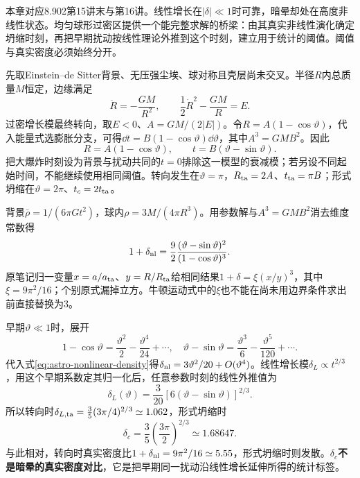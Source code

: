 本章对应8.902第15讲末与第16讲。线性增长在$|\delta|\ll1$时可靠，暗晕却处在高度非线性状态。均匀球形过密区提供一个能完整求解的桥梁：由其真实非线性演化确定坍缩时刻，再把早期扰动按线性理论外推到这个时刻，建立用于统计的阈值。阈值与真实密度必须始终分开。

先取Einstein--de Sitter背景、无压强尘埃、球对称且壳层尚未交叉。半径$R$内总质量$M$恒定，边缘满足
\[
 \ddot R=-\frac{GM}{R^2},\qquad \frac12\dot R^2-\frac{GM}{R}=E.
\]
过密增长模最终转向，取$E<0$、$A=GM/(2|E|)$。令$R=A(1-\cos\vartheta)$，代入能量式选膨胀分支，可得$\dd t=B(1-\cos\vartheta)\dd\vartheta$，其中$A^3=GMB^2$。因此
\begin{equation}\label{eq:astro-top-hat-param}
 R=A(1-\cos\vartheta),\qquad t=B(\vartheta-\sin\vartheta).
\end{equation}
把大爆炸时刻设为背景与扰动共同的$t=0$排除这一模型的衰减模；若另设不同起始时间，不能继续使用相同阈值。转向发生在$\vartheta=\pi$，$R_{\rm ta}=2A$、$t_{\rm ta}=\pi B$；形式坍缩在$\vartheta=2\pi$、$t_c=2t_{\rm ta}$。

背景$\bar\rho=1/(6\pi Gt^2)$，球内$\rho=3M/(4\pi R^3)$。用参数解与$A^3=GMB^2$消去维度常数得
\begin{equation}\label{eq:astro-nonlinear-density}
 1+\delta_{\rm nl}=\frac92\frac{(\vartheta-\sin\vartheta)^2}{(1-\cos\vartheta)^3}.
\end{equation}
原笔记归一变量$x=a/a_{\rm ta}$、$y=R/R_{\rm ta}$给相同结果$1+\delta=\xi(x/y)^3$，其中$\xi=9\pi^2/16$；个别原式漏掉立方。牛顿运动式中的$\xi$也不能在尚未用边界条件求出前直接替换为3。

早期$\vartheta\ll1$时，展开
\[
 1-\cos\vartheta=\frac{\vartheta^2}{2}-\frac{\vartheta^4}{24}+\cdots,\quad
 \vartheta-\sin\vartheta=\frac{\vartheta^3}{6}-\frac{\vartheta^5}{120}+\cdots.
\]
代入式\eqref{eq:astro-nonlinear-density}得$\delta_{\rm nl}=3\vartheta^2/20+O(\vartheta^4)$。线性增长模$\delta_L\propto t^{2/3}$，用这个早期系数定其归一化后，任意参数时刻的线性外推值为
\[
 \delta_L(\vartheta)=\frac3{20}[6(\vartheta-\sin\vartheta)]^{2/3}.
\]
所以转向时$\delta_{L,\rm ta}=\frac35(3\pi/4)^{2/3}\simeq1.062$，形式坍缩时
\begin{equation}\label{eq:astro-delta-collapse}
 \delta_c=\frac35\left(\frac{3\pi}{2}\right)^{2/3}\simeq1.68647.
\end{equation}
与此相对，转向时真实密度比$1+\delta_{\rm nl}=9\pi^2/16\simeq5.55$，形式坍缩时则发散。\textbf{$\delta_c$不是暗晕的真实密度对比}，它是把早期同一扰动沿线性增长延伸所得的统计标签。

